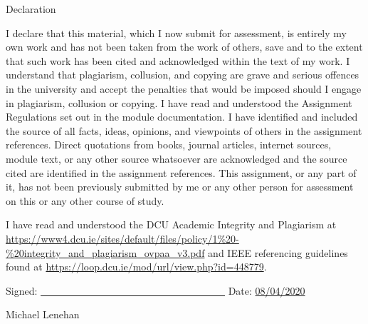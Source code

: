 \thispagestyle{plain}
\begingroup
\renewcommand{\cleardoublepage}{}
\renewcommand{\clearpage}{}

\LARGE{Declaration}

\endgroup

\vskip 1cm

I declare that this material, which I now submit for assessment, is entirely my
own work and has not been taken from the work of others, save and to the extent
that such work has been cited and acknowledged within the text of my work. I
understand that plagiarism, collusion, and copying are grave and serious
offences in the university and accept the penalties that would be imposed should
I engage in plagiarism, collusion or copying. I have read and understood the
Assignment Regulations set out in the module documentation. I have identified
and included the source of all facts, ideas, opinions, and viewpoints of others
in the assignment references. Direct quotations from books, journal articles,
internet sources, module text, or any other source whatsoever are acknowledged
and the source cited are identified in the assignment references. This
assignment, or any part of it, has not been previously submitted by me or any
other person for assessment on this or any other course of study.

I have read and understood the DCU Academic Integrity and Plagiarism at
\url{https://www4.dcu.ie/sites/default/files/policy/1%20-%20integrity_and_plagiarism\_ovpaa_v3.pdf}
and IEEE referencing guidelines found at
\url{https://loop.dcu.ie/mod/url/view.php?id=448779}.

\vskip 1cm
Signed: \underline{\ \ \ \ \ \ \ \ \ \ \ \ \ \ \ \ \ \ \ \ \ \ \ \ \ \ \ \ \ \ \
\ \ \ \ \ \ } \hspace{20mm}Date: \underline{08/04/2020}

\hspace*{0mm}\phantom{Signed:}Michael Lenehan

\pagebreak
